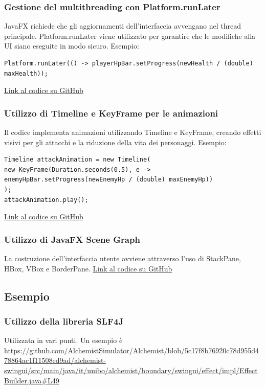 \documentclass[a4paper,12pt]{report}
\begin{document}
\subsubsection{Gestione del multithreading con Platform.runLater}
JavaFX richiede che gli aggiornamenti dell'interfaccia avvengano nel thread principale. Platform.runLater viene utilizzato per garantire che le modifiche alla UI siano eseguite in modo sicuro.\newline
Esempio:
\begin{verbatim}
Platform.runLater(() -> playerHpBar.setProgress(newHealth / (double) maxHealth));
\end{verbatim}
\href{https://github.com/}{Link al codice su GitHub}

\subsubsection{Utilizzo di Timeline e KeyFrame per le animazioni}
Il codice implementa animazioni utilizzando Timeline e KeyFrame, creando effetti visivi per gli attacchi e la riduzione della vita dei personaggi.\newline
Esempio:
\begin{verbatim}
Timeline attackAnimation = new Timeline(
new KeyFrame(Duration.seconds(0.5), e -> enemyHpBar.setProgress(newEnemyHp / (double) maxEnemyHp))
);
attackAnimation.play();
\end{verbatim}
\href{https://github.com/}{Link al codice su GitHub}

\subsubsection{Utilizzo di JavaFX Scene Graph}
La costruzione dell'interfaccia utente avviene attraverso l'uso di StackPane, HBox, VBox e BorderPane.\newline
\href{https://github.com/}{Link al codice su GitHub}


\subsection{Esempio}

\subsubsection{Utilizzo della libreria SLF4J}

Utilizzata in vari punti.
Un esempio è \url{https://github.com/AlchemistSimulator/Alchemist/blob/5c17f8b76920c78d955d478864ac1f11508ed9ad/alchemist-swingui/src/main/java/it/unibo/alchemist/boundary/swingui/effect/impl/EffectBuilder.java#L49}
\end{document}
